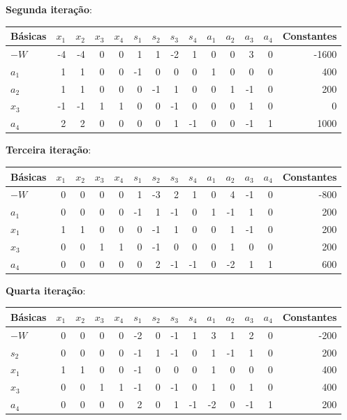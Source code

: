 \documentclass[12pt, a4paper]{article}
\begin{document}
\textbf{Segunda iteração}:
\begin{center}
\begin{tabular}{lrrrrrrrrrrrrr}
\toprule
Básicas & $x_1$ & $x_2$ & $x_3$ & $x_4$ & $s_1$ & $s_2$ & $s_3$ & $s_4$ & $a_1$ & $a_2$ & $a_3$ & $a_4$ & Constantes \\
\midrule
$-W$ & -4 & -4 & 0 & 0 & 1 & 1 & -2 & 1 & 0 & 0 & 3 & 0 & -1600 \\
$a_1$ & 1 & 1 & 0 & 0 & -1 & 0 & 0 & 0 & 1 & 0 & 0 & 0 & 400 \\
$a_2$ & 1 & 1 & 0 & 0 & 0 & -1 & 1 & 0 & 0 & 1 & -1 & 0 & 200 \\
$x_3$ & -1 & -1 & 1 & 1 & 0 & 0 & -1 & 0 & 0 & 0 & 1 & 0 & 0 \\
$a_4$ & 2 & 2 & 0 & 0 & 0 & 0 & 1 & -1 & 0 & 0 & -1 & 1 & 1000 \\
\bottomrule
\end{tabular}
\end{center}

\textbf{Terceira iteração}:
\begin{center}
\begin{tabular}{lrrrrrrrrrrrrr}
\toprule
Básicas & $x_1$ & $x_2$ & $x_3$ & $x_4$ & $s_1$ & $s_2$ & $s_3$ & $s_4$ & $a_1$ & $a_2$ & $a_3$ & $a_4$ & Constantes \\
\midrule
$-W$ & 0 & 0 & 0 & 0 & 1 & -3 & 2 & 1 & 0 & 4 & -1 & 0 & -800 \\
$a_1$ & 0 & 0 & 0 & 0 & -1 & 1 & -1 & 0 & 1 & -1 & 1 & 0 & 200 \\
$x_1$ & 1 & 1 & 0 & 0 & 0 & -1 & 1 & 0 & 0 & 1 & -1 & 0 & 200 \\
$x_3$ & 0 & 0 & 1 & 1 & 0 & -1 & 0 & 0 & 0 & 1 & 0 & 0 & 200 \\
$a_4$ & 0 & 0 & 0 & 0 & 0 & 2 & -1 & -1 & 0 & -2 & 1 & 1 & 600 \\
\bottomrule
\end{tabular}
\end{center}

\textbf{Quarta iteração}:
\begin{center}
\begin{tabular}{lrrrrrrrrrrrrr}
\toprule
Básicas & $x_1$ & $x_2$ & $x_3$ & $x_4$ & $s_1$ & $s_2$ & $s_3$ & $s_4$ & $a_1$ & $a_2$ & $a_3$ & $a_4$ & Constantes \\
\midrule
$-W$ & 0 & 0 & 0 & 0 & -2 & 0 & -1 & 1 & 3 & 1 & 2 & 0 & -200 \\
$s_2$ & 0 & 0 & 0 & 0 & -1 & 1 & -1 & 0 & 1 & -1 & 1 & 0 & 200 \\
$x_1$ & 1 & 1 & 0 & 0 & -1 & 0 & 0 & 0 & 1 & 0 & 0 & 0 & 400 \\
$x_3$ & 0 & 0 & 1 & 1 & -1 & 0 & -1 & 0 & 1 & 0 & 1 & 0 & 400 \\
$a_4$ & 0 & 0 & 0 & 0 & 2 & 0 & 1 & -1 & -2 & 0 & -1 & 1 & 200 \\
\bottomrule
\end{tabular}
\end{center}
\end{document}
